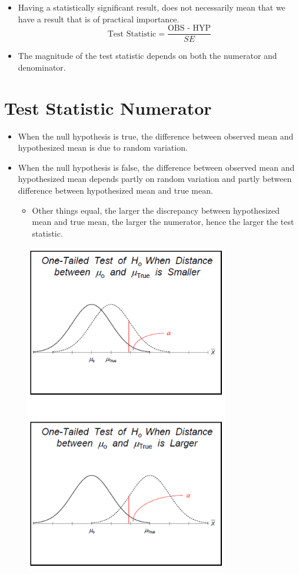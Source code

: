 \documentclass[12pt]{article}
\begin{document}
\begin{itemize}
\itemsep1pt\parskip0pt
\item
  Having a statistically significant result, does not necessarily mean
  that we have a result that is of practical importance.
  \[ \mbox{Test Statistic} = \frac{\mbox{OBS - HYP}}{SE} \]
\item
  The magnitude of the test statistic depends on both the numerator and
  denominator.
\end{itemize}

\section{Test Statistic Numerator}\label{test-statistic-numerator}

\begin{itemize}
\itemsep1pt\parskip0pt
\item
  When the null hypothesis is true, the difference between observed mean
  and hypothesized mean is due to random variation.
\item
  When the null hypothesis is false, the difference between observed
  mean and hypothesized mean depends partly on random variation and
  partly between difference between hypothesized mean and true mean.

  \begin{itemize}
  \itemsep1pt\parskip0pt
  \item
    Other things equal, the larger the discrepancy between hypothesized
    mean and true mean, the larger the numerator, hence the larger the
    test statistic.
  \end{itemize}
\end{itemize}

\begin{figure}[H]
\centering
\includegraphics[width=3.5in]{prac_num.png}
\caption{}
\end{figure}
\end{document}
